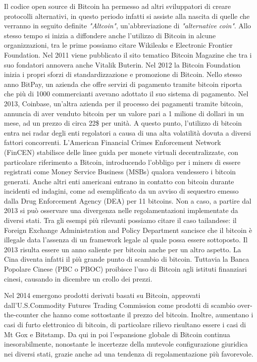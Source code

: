 Il codice open source di Bitcoin ha permesso ad altri sviluppatori di creare protocolli alternativi\cite{K16}, in questo periodo infatti si assiste alla nascita di quelle che verranno in seguito definite \textit{"Altcoin"}, un'abbreviazione di \textit{"alternative coin"}. Allo stesso tempo si inizia a diffondere anche l'utilizzo di Bitcoin in alcune organizzazioni, tra le prime possiamo citare Wikileaks e Electronic Frontier Foundation. Nel 2011 viene pubblicato il sito tematico Bitcoin Magazine che tra i suo fondatori annovera anche Vitalik Buterin. Nel 2012 la Bitcoin Foundation inizia i propri sforzi di standardizzazione e promozione di Bitcoin. Nello stesso anno BitPay, un azienda che offre servizi di pagamento tramite bitcoin riporta che più di 1000 commercianti avevano adottato il suo sistema di pagamento. Nel 2013, Coinbase, un'altra azienda per il processo dei pagamenti tramite bitcoin, annuncia di aver venduto bitcoin per un valore pari a 1 milione di dollari in un mese, ad un prezzo di circa 22\$ per unità. 
A questo punto, l'utilizzo di bitcoin entra nei radar degli enti regolatori a causa di una alta volatilità dovuta a diversi fattori concorrenti. L'American Financial Crimes Enforcement Network (FinCEN) stabilisce delle linee guida per monete virtuali decentralizzate, con particolare riferimento a Bitcoin, introducendo l'obbligo per i miners di essere registrati come Money Service Business (MSBs) qualora vendessero i bitcoin generati\cite{K17}. Anche altri enti americani entrano in contatto con bitcoin durante incidenti ed indagini, come ad esemplificato da un avviso di sequestro emesso dalla Drug Enforcement Agency (DEA) per 11 bitcoins. Non a caso, a partire dal 2013 si può osservare una divergenza nelle regolamentazioni implementate da diversi stati. 
Tra gli esempi più rilevanti possiamo citare il caso tailandese: il Foreign Exchange Administration and Policy Department sancisce che il bitcoin è illegale data l'assenza di un framework legale al quale possa essere sottoposto\cite{K18}. Il 2013 risulta essere un anno saliente per bitcoin anche per un altro aspetto. La Cina diventa infatti il più grande punto di scambio di bitcoin. Tuttavia la Banca Popolare Cinese (PBC o PBOC) proibisce l'uso di Bitcoin agli istituti finanziari cinesi, causando in dicembre un crollo dei prezzi\cite{K19}. 

Nel 2014 emergono prodotti derivati basati su Bitcoin, approvati dall'U.S.Commodity Futures Trading Commission come prodotti di scambio over-the-counter che hanno come sottostante il prezzo del bitcoin. Inoltre, aumentano i casi di furto elettronico di bitcoin, di particolare rilievo risultano essere i casi di Mt Gox e Bitstamp. 
Da qui in poi l'espansione globale di Bitcoin continua inesorabilmente, nonostante le incertezze della mutevole configurazione giuridica nei diversi stati, grazie anche ad una tendenza di regolamentazione più favorevole.  

